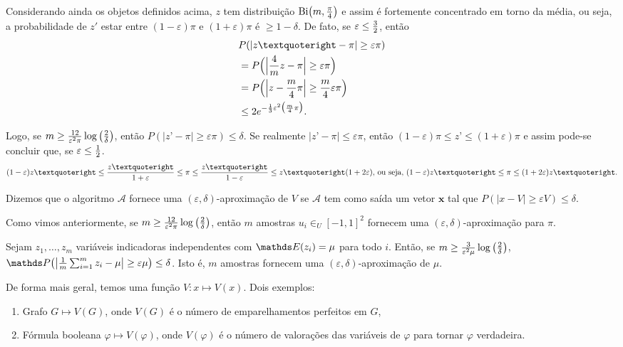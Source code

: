 Considerando ainda os objetos definidos acima, $z$ tem distribuição $\mathrm{Bi}\big(m, {\pi \over 4}\big)$ e assim é fortemente concentrado em torno da média, ou seja, a probabilidade de $z'$ estar entre $(1-\varepsilon)\pi$ e $(1+\varepsilon)\pi$ é $\geq 1- \delta$. De fato, se $\varepsilon \leq {3 \over 2}$, então
\begin{align*}
  &P( | z’ - \pi | \geq \varepsilon \pi) \\
      &= P\Big(\Big| {4 \over m}z - \pi \Big| \geq \varepsilon \pi\Big) \\
      &= P\Big(\Big| z - {m \over 4}\pi \Big| \geq {m \over 4} \varepsilon \pi\Big) \\
      &\leq 2e^{- {1 \over 3} \varepsilon^2\big({m \over 4}\pi\big)}.
\end{align*}

Logo, se $m \geq {12 \over \varepsilon^2 \pi} \log \big({2 \over \delta}\big)$, então $P( | z’ - \pi | \geq \varepsilon \pi) \leq \delta$. Se realmente $|z’-\pi| \leq \varepsilon \pi$, então $(1-\varepsilon)\pi \leq z’ \leq (1+\varepsilon)\pi$ e assim pode-se concluir que, se $\varepsilon \leq {1 \over 2}$.
$$(1-\varepsilon)z’ \leq {z’ \over 1 + \varepsilon} \leq \pi \leq {z’ \over 1 - \varepsilon} \leq z’(1+2\varepsilon) \text{, ou seja, } (1-\varepsilon)z’ \leq \pi \leq (1+2\varepsilon)z’.$$

\begin{definicao}
Dizemos que o algoritmo $\mathscr{A}$ fornece uma $(\varepsilon, \delta)$-aproximação de $V$ se $\mathscr{A}$ tem como saída um vetor $\mathbf{x}$ tal que $P(|x - V| \geq \varepsilon V) \leq \delta$.
\end{definicao}

Como vimos anteriormente, se $m \geq {12 \over \varepsilon^2 \pi} \log \big({2 \over \delta}\big)$, então $m$ amostras $u_i \in_U [-1, 1]^2$ fornecem uma $(\varepsilon, \delta)$-aproximação para $\pi$.

\begin{teorema}
\label{teorema:edaproximacao}
Sejam $z_1, \dots, z_m$ variáveis indicadoras independentes com $\EE(z_i) = \mu$ para todo $i$. Então, se $m \geq {3 \over \varepsilon^2 \mu} \log \big({2 \over \delta}\big)$, $\PP\big(\big|{1\over m} \sum_{i = 1}^m z_i - \mu\big| \geq \varepsilon \mu\big) \leq \delta$. Isto é, $m$ amostras fornecem uma $(\varepsilon, \delta)$-aproximação de $\mu$.
\end{teorema}

De forma mais geral, temos uma função $V: x \mapsto V(x)$. Dois exemplos:
\begin{enumerate}
\item Grafo $G \mapsto V(G)$, onde $V(G)$ é o número de emparelhamentos perfeitos em $G$,
\item Fórmula booleana $\varphi \mapsto V(\varphi)$, onde $V(\varphi)$ é o número de valorações das variáveis de $\varphi$ para tornar $\varphi$ verdadeira.
\end{enumerate}


